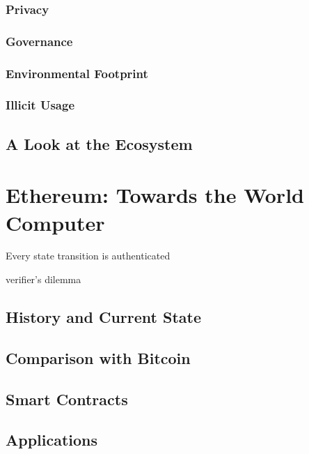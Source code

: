 \subsubsection{Privacy}

\subsubsection{Governance}

\subsubsection{Environmental Footprint}

\subsubsection{Illicit Usage}


\subsection{A Look at the Ecosystem}



\section{Ethereum: Towards the World Computer}

Every state transition is authenticated 

\cite{Luu:2015:DIC:2810103.2813659} verifier's dilemma

\subsection{History and Current State}

\subsection{Comparison with Bitcoin}

\subsection{Smart Contracts}

\subsection{Applications}


